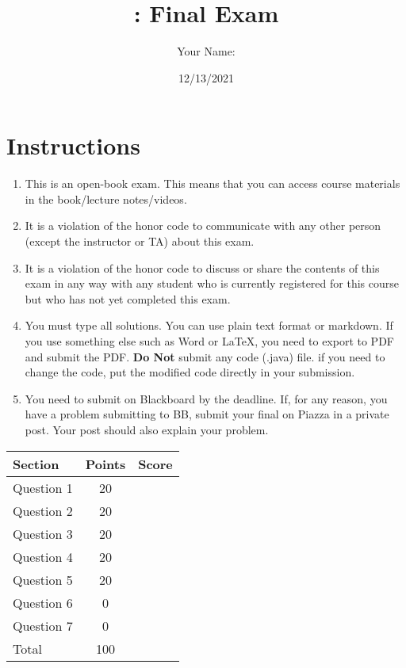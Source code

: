\documentclass[10pt]{article}
\author{Your Name:}
\date{12/13/2021}
\title{\classname{}: Final Exam}
\begin{document}
\maketitle
\section*{Instructions}

\begin{enumerate}
\item This is an open-book exam. This means that you can access course materials in the book/lecture notes/videos.  

\item It is a violation of the honor code to communicate with any other person (except the instructor or TA) about this exam.

\item It is a violation of the honor code to discuss or share the contents of this exam in any way with any student who is currently registered for this course but who has not yet completed this exam.


\item You must type all solutions.  You can use plain text format or markdown.  If you use something else such as Word or LaTeX, you need to export to PDF and submit the PDF.  \textbf{Do Not} submit any code (.java) file.   if you need to change the code, put the modified code directly in your submission.  

\item You need to submit on Blackboard by the deadline. If, for any reason, you have a problem submitting to BB,  submit your final on Piazza in a private post.  Your post should also explain your problem.

\end{enumerate}


\begin{center}
  \begin{tabular}{lcc}
    \toprule
    Section		&	Points	&	Score \\
    \midrule
    Question 1	&	 20	& \\
    Question 2	&	 20	& \\
    Question 3 	&	 20	& \\
    Question 4 	&	 20	& \\
    Question 5 	&	 20	& \\
    Question 6 	&	 0	& \\
    Question 7 	&	 0	& \\
    \midrule
    Total		&	100	& \\
    \bottomrule
  \end{tabular}
\end{center}
\end{document}
